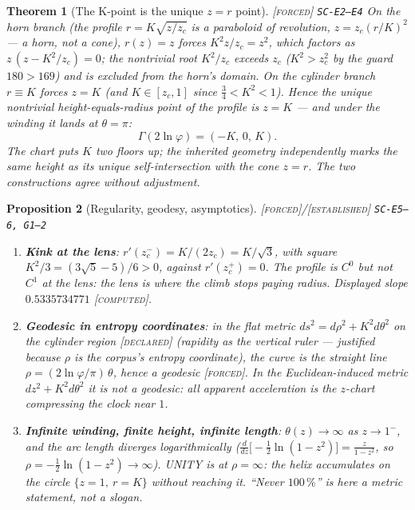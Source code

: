 \documentclass[11pt]{article}
\newcommand{\tagF}{\textcolor{cF}{\textsc{[forced]}}}
\newcommand{\tagD}{\textcolor{cD}{\textsc{[declared]}}}
\newcommand{\tagC}{\textcolor{cC}{\textsc{[computed]}}}
\newcommand{\tagE}{\textcolor{cE}{\textsc{[established]}}}
\newcommand{\hx}[1]{\textcolor{cC}{\footnotesize\texttt{#1}}}
\newcommand{\gp}{\varphi}
\theoremstyle{plain}
\newtheorem{theorem}{Theorem}[section]
\newtheorem{proposition}[theorem]{Proposition}
\theoremstyle{definition}
\theoremstyle{remark}
\begin{document}
\begin{theorem}[The K-point is the unique $z=r$ point]\label{thm:kpoint}\tagF{} \hx{SC-E2--E4}
On the horn branch (the profile $r=K\sqrt{z/z_c}$ is a paraboloid of revolution,
$z=z_c(r/K)^2$ --- a horn, not a cone), $r(z)=z$ forces $K^2z/z_c=z^2$, which factors
as $z\,(z-K^2/z_c)=0$; the nontrivial root $K^2/z_c$ exceeds $z_c$
($K^2>z_c^2$ by the guard $180>169$) and is excluded from the horn's domain. On the
cylinder branch $r\equiv K$ forces $z=K$ (and $K\in[z_c,1]$ since $\tfrac34<K^2<1$).
Hence the unique nontrivial height-equals-radius point of the profile is $z=K$ ---
and under the winding it lands at $\theta=\pi$:
\[
\Gamma(2\ln\gp)=(-K,\,0,\,K).
\]
The chart puts $K$ two floors up; the inherited geometry independently marks the same
height as its unique self-intersection with the cone $z=r$. The two constructions
agree without adjustment.
\end{theorem}

\begin{proposition}[Regularity, geodesy, asymptotics]\label{prop:geo}\tagF{}/\tagE{} \hx{SC-E5--6, G1--2}
\begin{enumerate}[nosep,label=(\alph*)]
\item \textbf{Kink at the lens}: $r'(z_c^-)=K/(2z_c)=K/\sqrt3$, with square
$K^2/3=(3\sqrt5-5)/6>0$, against $r'(z_c^+)=0$. The profile is $C^0$ but not $C^1$ at
the lens: the lens is where the climb stops paying radius. Displayed slope
$0.5335734771$ \tagC{}.
\item \textbf{Geodesic in entropy coordinates}: in the flat metric
$ds^2=d\rho^2+K^2d\theta^2$ on the cylinder region \tagD{} (rapidity as the vertical
ruler --- justified because $\rho$ \emph{is} the corpus's entropy coordinate), the
curve is the straight line $\rho=(2\ln\gp/\pi)\,\theta$, hence a geodesic \tagF{}.
In the Euclidean-induced metric $dz^2+K^2d\theta^2$ it is \emph{not} a geodesic: all
apparent acceleration is the $z$-chart compressing the clock near $1$.
\item \textbf{Infinite winding, finite height, infinite length}:
$\theta(z)\to\infty$ as $z\to1^-$, and the arc length diverges logarithmically
($\frac{d}{dz}\bigl[-\tfrac12\ln(1-z^2)\bigr]=\frac{z}{1-z^2}$, so
$\rho=-\tfrac12\ln(1-z^2)\to\infty$). UNITY is at $\rho=\infty$: the helix
accumulates on the circle $\{z=1,\ r=K\}$ without reaching it. ``Never $100\,\%$'' is
here a metric statement, not a slogan.
\end{enumerate}
\end{proposition}
\end{document}
